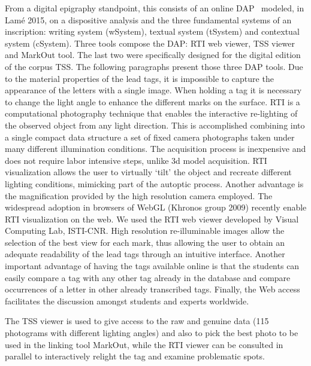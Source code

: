 \documentclass[amsthm,ebook]{saparticle}
\begin{document}
From a digital epigraphy standpoint, this consists of an online DAP \ modeled, in Lamé 2015, on a dispositive analysis
and the three fundamental systems of an inscription: writing system (wSystem), textual system (tSystem) and contextual
system (cSystem). Three tools compose the DAP: RTI web viewer, TSS viewer and MarkOut tool. The last two were
specifically designed for the digital edition of the corpus TSS. The following paragraphs present those three DAP
tools. Due to the material properties of the lead tags, it is impossible to capture the appearance of the letters with
a single image. When holding a tag it is necessary to change the light angle to enhance the different marks on the
surface. RTI is a computational photography technique that enables the interactive re-lighting of the observed object
from any light direction. This is accomplished combining into a single compact data structure a set of fixed camera
photographs taken under many different illumination conditions. The acquisition process is inexpensive and does not
require labor intensive steps, unlike 3d model acquisition. RTI visualization allows the user to virtually ‘tilt’ the
object and recreate different lighting conditions, mimicking part of the autoptic process. Another advantage is the
magnification provided by the high resolution camera employed. The widespread adoption in browsers of WebGL (Khronos
group 2009) recently enable RTI visualization on the web. We used the RTI web viewer developed by Visual Computing Lab,
ISTI-CNR. High resolution re-illuminable images allow the selection of the best view for each mark, thus allowing the
user to obtain an adequate readability of the lead tags through an intuitive interface. Another important advantage of
having the tags available online is that the students can easily compare a tag with any other tag already in the
database and compare occurrences of a letter in other already transcribed tags. Finally, the Web access facilitates the
discussion amongst students and experts worldwide.

The TSS viewer is used to give access to the raw and genuine data (115 photograms with different lighting angles) and
also to pick the best photo to be used in the linking tool MarkOut, while the RTI viewer can be consulted in parallel
to interactively relight the tag and examine problematic spots.
\end{document}
